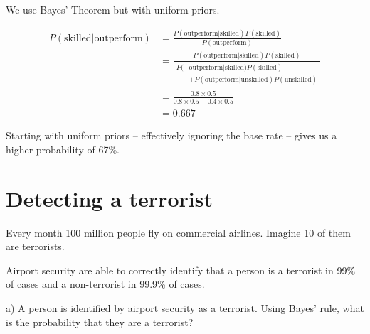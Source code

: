 \documentclass[
  letterpaper,
  DIV=11,
  numbers=noendperiod]{scrreprt}
\begin{document}
\begin{tcolorbox}[enhanced jigsaw, title=\textcolor{quarto-callout-tip-color}{\faLightbulb}\hspace{0.5em}{Answer}, toprule=.15mm, colback=white, breakable, titlerule=0mm, colframe=quarto-callout-tip-color-frame, coltitle=black, opacityback=0, rightrule=.15mm, colbacktitle=quarto-callout-tip-color!10!white, bottomtitle=1mm, opacitybacktitle=0.6, arc=.35mm, bottomrule=.15mm, toptitle=1mm, leftrule=.75mm, left=2mm]

We use Bayes' Theorem but with uniform priors.

\begin{align*}
P(\text{skilled}|\text{outperform})&=\frac{P(\text{outperform}|\text{skilled})P(\text{skilled})}{P(\text{outperform})} \\[6pt]
&=\frac{P(\text{outperform}|\text{skilled})P(\text{skilled})}{\begin{aligned}P(&\text{outperform}|\text{skilled})P(\text{skilled})\\&+P(\text{outperform}|\text{unskilled})P(\text{unskilled})\end{aligned}} \\[6pt]
&=\frac{0.8\times 0.5}{0.8\times 0.5+0.4\times 0.5} \\[6pt]
&=0.667
\end{align*}

Starting with uniform priors -- effectively ignoring the base rate --
gives us a higher probability of 67\%.

\end{tcolorbox}

\hypertarget{detecting-a-terrorist}{%
\section{Detecting a terrorist}\label{detecting-a-terrorist}}

Every month 100 million people fly on commercial airlines. Imagine 10 of
them are terrorists.

Airport security are able to correctly identify that a person is a
terrorist in 99\% of cases and a non-terrorist in 99.9\% of cases.

a) A person is identified by airport security as a terrorist. Using
Bayes' rule, what is the probability that they are a terrorist?
\end{document}

